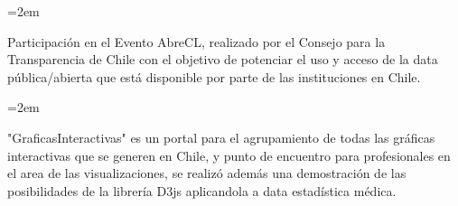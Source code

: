 \documentclass{scrartcl}	%
\newcommand{\Description}[1]{\hangindent=2em\hangafter=0\noindent\raggedright\footnotesize{#1}\par\normalsize}
\newcommand{\Sep}{\vspace{2em}}
\begin{document}
\begin{cv}{}
\Description{Participación en el Evento AbreCL, realizado por el Consejo para la Transparencia de Chile con el objetivo de potenciar el uso y acceso de la data pública/abierta que está disponible por parte de las instituciones en Chile.}
\Description{"GraficasInteractivas" es un portal para el agrupamiento de todas las gráficas interactivas que se generen en Chile, y punto de encuentro para profesionales en el area de las visualizaciones, se realizó además una demostración de las posibilidades de la librería D3js aplicandola a data estadística médica.}

\Sep


\enlargethispage{\baselineskip}

\end{cv}
\end{document}
